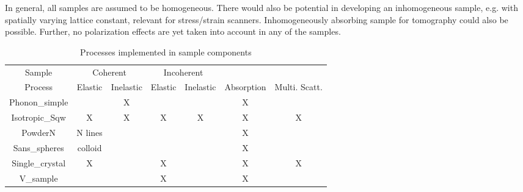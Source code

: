 In general, all samples are assumed to be homogeneous. There would also be
potential in developing an inhomogeneous sample, e.g. with
spatially varying lattice constant, relevant for stress/strain scanners.
Inhomogeneously absorbing sample for tomography could also be possible.
Further, no polarization effects are yet taken into account in any
of the samples.

\begin{table}
  \begin{center}
  {\let\my=\\
    \begin{tabular}{|c|cc|cc|c|c|}
    \hline
    Sample        & \multicolumn{2}{c|}{Coherent} & \multicolumn{2}{c|}{Incoherent} &&\\
    Process       & Elastic & Inelastic & Elastic & Inelastic & Absorption & Multi. Scatt.\\
    \hline
    Phonon\_simple&         & X         &         &           & X & \\
    Isotropic\_Sqw&  X      & X         & X       & X         & X & X \\
    PowderN       &  N lines&           &         &           & X & \\
    Sans\_spheres &  colloid&           &         &           & X & \\
    Single\_crystal& X      &           & X       &           & X & X \\
    V\_sample     &         &           & X       &           & X & \\
    \hline
    \end{tabular}
    \caption{Processes implemented in sample components}
    \label{t:sample-process}
  }
  \end{center}
\end{table}

         \newpage
          \newpage
   \newpage
             \newpage
           \newpage

